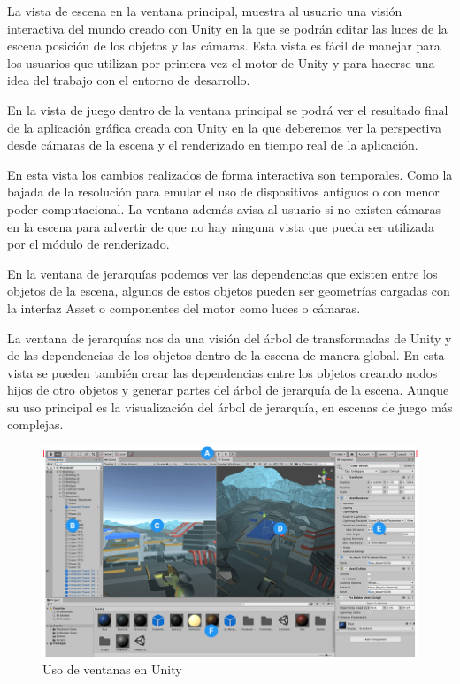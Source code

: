 \documentclass[a4paper, 17pt]{book}
\begin{document}
La vista de escena en la ventana principal, muestra al usuario una visión interactiva del mundo creado con
Unity en la que se podrán editar las luces de la escena posición de los objetos y las cámaras. Esta vista
es fácil de manejar para los usuarios que utilizan por primera vez el motor de Unity y para hacerse una
idea del trabajo con el entorno de desarrollo.

\vspace{1mm} %

En la vista de juego dentro de la ventana principal se podrá ver el resultado final de la aplicación gráfica
creada con Unity en la que deberemos ver la perspectiva desde cámaras de la escena y el renderizado en tiempo
real de la aplicación.

\vspace{1mm} %

En esta vista los cambios realizados de forma interactiva son temporales. Como la bajada de la resolución para
emular el uso de dispositivos antiguos o con menor poder computacional. La ventana además avisa al usuario si
no existen cámaras en la escena para advertir de que no hay ninguna vista que pueda ser utilizada por el módulo
de renderizado.

\vspace{1mm} %

En la ventana de jerarquías podemos ver las dependencias que existen entre los objetos de la escena, algunos de
estos objetos pueden ser geometrías cargadas con la interfaz Asset o componentes del motor como luces o cámaras. 

\vspace{1mm} %

La ventana de jerarquías nos da una visión del árbol de transformadas de Unity y de las dependencias de los
objetos dentro de la escena de manera global. En esta vista se pueden también crear las dependencias entre
los objetos creando nodos hijos de otro objetos y generar partes del árbol de jerarquía de la escena. Aunque
su uso principal es la visualización del árbol de jerarquía, en escenas de juego más complejas.

\begin{figure}[H]
    \centering
    \includegraphics[scale=0.30, keepaspectratio]{img/editor_unity.png}
    \caption{Uso de ventanas en Unity}
    \label{figura:editor_unity}
\end{figure}
\end{document}

